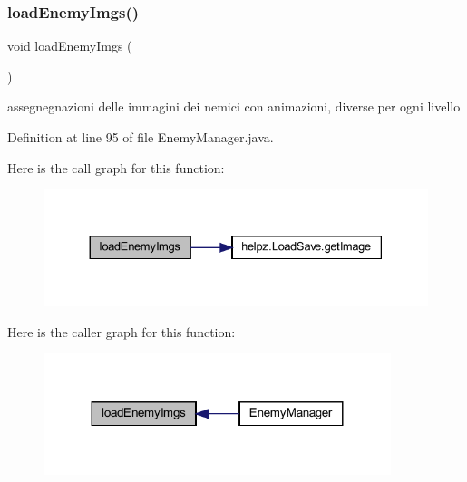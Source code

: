 \subsubsection{\texorpdfstring{load\+Enemy\+Imgs()}{loadEnemyImgs()}}
{\footnotesize\ttfamily void load\+Enemy\+Imgs (\begin{DoxyParamCaption}{ }\end{DoxyParamCaption})\hspace{0.3cm}{\ttfamily [private]}}



assegnegnazioni delle immagini dei nemici con animazioni, diverse per ogni livello 



Definition at line 95 of file Enemy\+Manager.\+java.

Here is the call graph for this function\+:
\nopagebreak
\begin{figure}[H]
\begin{center}
\leavevmode
\includegraphics[width=330pt]{classmanagers_1_1_enemy_manager_a774aefe7ec0626eb37d65a2335eade3b_cgraph}
\end{center}
\end{figure}
Here is the caller graph for this function\+:
\nopagebreak
\begin{figure}[H]
\begin{center}
\leavevmode
\includegraphics[width=287pt]{classmanagers_1_1_enemy_manager_a774aefe7ec0626eb37d65a2335eade3b_icgraph}
\end{center}
\end{figure}
\mbox{\label{classmanagers_1_1_enemy_manager_a839e4729819875981f138997b2d3f438}} 
